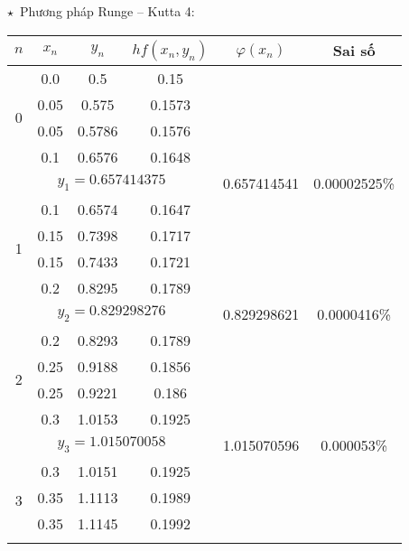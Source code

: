 $\star$~Phương pháp Runge – Kutta 4:
\begin{longtable}{|c|c|c|c|c|c|}\hline
	$n$                & $x_n$ & $y_n$  & $hf(x_n, y_n)$ & $\varphi(x_n)$ & Sai số \\ \hline
	\endhead
	\multirow{4}{*}{0} & 0.0   & 0.5    & 0.15           &                &          \\ \cline{2-4}
	                   & 0.05  & 0.575  & 0.1573         &                &          \\ \cline{2-4}
	                   & 0.05  & 0.5786 & 0.1576         &                &          \\ \cline{2-4}
	                   & 0.1   & 0.6576 & 0.1648         &                &          \\ \hline
	\multicolumn{4}{|c|}{$y_1 = 0.657414375$}             & 0.657414541   & 0.00002525\% \\ \hline
	\multirow{4}{*}{1} & 0.1   & 0.6574 & 0.1647         &                &          \\ \cline{2-4}
	                   & 0.15  & 0.7398 & 0.1717         &                &          \\ \cline{2-4}
	                   & 0.15  & 0.7433 & 0.1721         &                &          \\ \cline{2-4}
	                   & 0.2   & 0.8295 & 0.1789         &                &          \\ \hline
	\multicolumn{4}{|c|}{$y_2 = 0.829298276$}             & 0.829298621   & 0.0000416\% \\ \hline
	\multirow{4}{*}{2} & 0.2   & 0.8293 & 0.1789         &                &          \\ \cline{2-4}
	                   & 0.25  & 0.9188 & 0.1856         &                &          \\ \cline{2-4}
	                   & 0.25  & 0.9221 & 0.186          &                &          \\ \cline{2-4}
	                   & 0.3   & 1.0153 & 0.1925         &                &          \\ \hline
	\multicolumn{4}{|c|}{$y_3 = 1.015070058$}            & 1.015070596    & 0.000053\% \\ \hline
	\multirow{4}{*}{3} & 0.3   & 1.0151 & 0.1925         &                &          \\ \cline{2-4}
	                   & 0.35  & 1.1113 & 0.1989         &                &          \\ \cline{2-4}
	                   & 0.35  & 1.1145 & 0.1992         &                &          \\ \cline{2-4}

\end{longtable}
